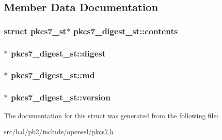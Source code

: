 \subsection{Member Data Documentation}
\subsubsection[{\texorpdfstring{contents}{contents}}]{\setlength{\rightskip}{0pt plus 5cm}struct {\bf pkcs7\+\_\+st}$\ast$ pkcs7\+\_\+digest\+\_\+st\+::contents}\hypertarget{structpkcs7__digest__st_ac519ce261ee599eaacd0ac4f2f06ebe7}{}\label{structpkcs7__digest__st_ac519ce261ee599eaacd0ac4f2f06ebe7}
\subsubsection[{\texorpdfstring{digest}{digest}}]{$\ast$ pkcs7\+\_\+digest\+\_\+st\+::digest}\hypertarget{structpkcs7__digest__st_ad75a037194fd4d99c1a5aa180a8e96e8}{}\label{structpkcs7__digest__st_ad75a037194fd4d99c1a5aa180a8e96e8}
\subsubsection[{\texorpdfstring{md}{md}}]{$\ast$ pkcs7\+\_\+digest\+\_\+st\+::md}\hypertarget{structpkcs7__digest__st_a76481d96de4d0f8457fe75c6d29131e6}{}\label{structpkcs7__digest__st_a76481d96de4d0f8457fe75c6d29131e6}
\subsubsection[{\texorpdfstring{version}{version}}]{$\ast$ pkcs7\+\_\+digest\+\_\+st\+::version}\hypertarget{structpkcs7__digest__st_ad46797a922e60a6fc3a30e0e694dd7d4}{}\label{structpkcs7__digest__st_ad46797a922e60a6fc3a30e0e694dd7d4}


The documentation for this struct was generated from the following file\+:\begin{DoxyCompactItemize}
\item 
src/hal/pb2/include/openssl/\hyperlink{pkcs7_8h}{pkcs7.\+h}\end{DoxyCompactItemize}
